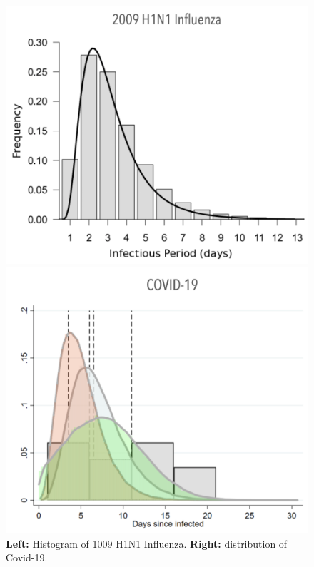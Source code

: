 \documentclass[../main/main.tex]{subfiles}
\begin{document}
\begin{figure}[h!]
\begin{minipage}[c]{0.5\linewidth}
\centering
\includegraphics[width=1\textwidth]{../lessons/image/09/1.png}
\end{minipage}
\begin{minipage}[]{0.5\linewidth}
\centering
\includegraphics[width=1\textwidth]{../lessons/image/09/2.png}
\end{minipage}
\caption{\label{fig:09_1} \textbf{Left:} Histogram of 1009 H1N1 Influenza. \textbf{Right:} distribution  of Covid-19. }
\end{figure}
\end{document}
